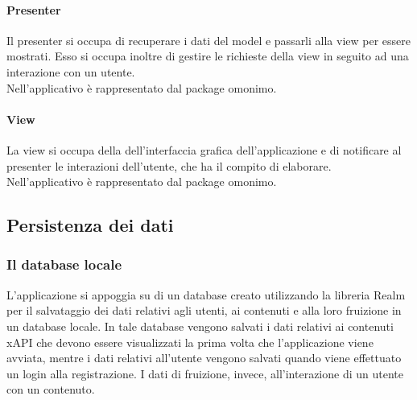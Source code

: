 \documentclass[../Tesi.tex]{subfiles}
\begin{document}
		\paragraph*{Presenter}
		Il presenter si occupa di recuperare i dati del model e passarli alla view per essere mostrati. Esso si occupa inoltre di gestire le richieste della view in seguito ad una interazione con un utente. \\ Nell'applicativo è rappresentato dal package omonimo.

		\paragraph*{View}
		La view si occupa della dell'interfaccia grafica dell'applicazione e di notificare al presenter le interazioni dell'utente, che ha il compito di elaborare. \\ Nell'applicativo è rappresentato dal package omonimo.
	
	\subsection{Persistenza dei dati}
		\subsubsection{Il database locale}
		L'applicazione si appoggia su di un database creato utilizzando la libreria Realm per il salvataggio dei dati relativi agli utenti, ai contenuti e alla loro fruizione in un database locale. In tale database vengono salvati i dati relativi ai contenuti xAPI che devono essere visualizzati la prima volta che l'applicazione viene avviata, mentre i dati relativi all'utente vengono salvati quando viene effettuato un login alla registrazione. I dati di fruizione, invece, all'interazione di un utente con un contenuto.
			
\end{document}
